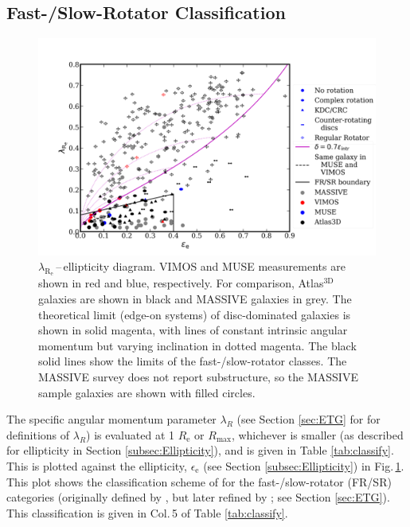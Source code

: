 	\subsection{Fast-/Slow-Rotator Classification}
		\label{subsec:FSRot}

		\begin{figure}[t]
			\centering
			\includegraphics[width=\textwidth]{chapter4/lambda_R_ellipticity.png}
			\caption[$\lambda_\mathrm{R_e}$\,--\,ellipticity diagram]{$\lambda_\mathrm{R_e}$\,--\,ellipticity diagram. VIMOS and MUSE measurements are shown in red and blue, respectively. For comparison, Atlas$^\text{3D}$ galaxies \citep{Emsellem2011} are shown in black and MASSIVE galaxies \citep{Veale2017} in grey. The theoretical limit (edge-on systems) of disc-dominated galaxies is shown in solid magenta, with lines of constant intrinsic angular momentum but varying inclination in dotted magenta. The black solid lines show the limits of the fast-/slow-rotator classes. The MASSIVE survey does not report substructure, so the MASSIVE sample galaxies are shown with filled circles.}
			\label{fig:lambdaR_ellip}
		\end{figure}

		The specific angular momentum parameter $\lambda_R$ (see Section \ref{sec:ETG} for for definitions of $\lambda_R$) is evaluated at 1 $R_\mathrm{e}$ or $R_\text{max}$, whichever is smaller (as described for ellipticity in Section \ref{subsec:Ellipticity}), and is given in Table \ref{tab:classify}. This is plotted against the ellipticity, $\epsilon_\mathrm{e}$ (see Section \ref{subsec:Ellipticity}) in Fig.\,\ref{fig:lambdaR_ellip}. This plot shows the classification scheme of \citet{Cappellari2016} for the fast-/slow-rotator (FR/SR) categories (originally defined by \citealt{Emsellem2011}, but later refined by \citealt{Cappellari2016}; see Section \ref{sec:ETG}). This classification is given in Col.\,5 of Table \ref{tab:classify}.

